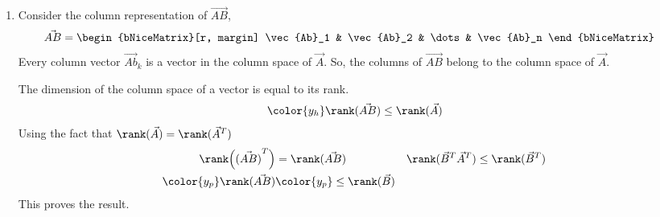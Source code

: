 \begin{enumerate}
    \item Consider the column representation of $ \vec{AB} $,
          \begin{align}
              \vec{AB} & = \begin{bNiceMatrix}[r, margin]
                               \vec{Ab}_1 & \vec{Ab}_2 & \dots & \vec{Ab}_n
                           \end{bNiceMatrix}
          \end{align}
          Every column vector $ \vec{Ab}_k $ is a vector in the column space of
          $ \vec{A} $. So, the columns of $ \vec{AB} $ belong to the column space of
          $ \vec{A} $. \par
          The dimension of the column space of a vector is equal to its rank.
          \begin{align}
              \color{y_h} \rank(\vec{AB}) \leq \rank(\vec{A})
          \end{align}
          Using the fact that $ \rank(\vec{A}) = \rank(\vec{A}^T) $
          \begin{align}
              \rank\Big(\vec{(AB)}^T\Big) & = \rank(\vec{AB})               &
              \rank(\vec{B}^T \vec{A}^T)  & \leq \rank(\vec{B}^T)             \\
              \color{y_p} \rank(\vec{AB}) & \color{y_p} \leq \rank(\vec{B})
          \end{align}
          This proves the result.


\end{enumerate}

